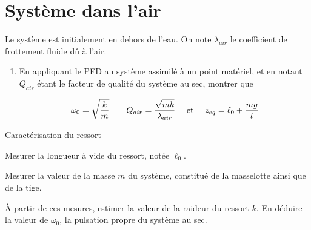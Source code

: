 \documentclass[a4paper,french,bookmarks]{article}
\begin{document}
\section{Système dans l’air}\label{sec:2}

Le système est initialement en dehors de l’eau. On note $\lambda_{air}$ le coefficient de frottement fluide dû à l’air.

\begin{enumerate}
    \item En appliquant le PFD au système assimilé à un point matériel, et en notant $Q_{air}$ étant le facteur de qualité du système au sec, montrer que
    
    \begin{equation}
        \omega_0 = \sqrt{\dfrac{k}{m}} \qquad Q_{air} = \dfrac{\sqrt{mk}}{\lambda_{air}} \quad\ \text{et} \ \quad z_{eq} = \ell_0 + \dfrac{mg}{l}
    \end{equation}
    
    
\end{enumerate}
    
\begin{experience}{Caractérisation du ressort}{}
    \begin{enumerate}
        \ithand Mesurer la longueur à vide du ressort, notée $\ell_0$.
        
        \ithand Mesurer la valeur de la masse $m$ du système, constitué de la masselotte ainsi que de la tige.
        
        \ithand À partir de ces mesures, estimer la valeur de la raideur du ressort $k$. En déduire la valeur de $\omega_0$, la pulsation propre du système au sec.
    \end{enumerate}
\end{experience}
\end{document}
